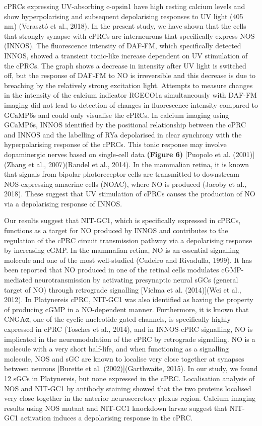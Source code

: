 \documentclass[
  10pt,
  onecolumn]{article}
\begin{document}
cPRCs expressing UV-absorbing c-opsin1 have high resting calcium levels
and show hyperpolarising and subsequent depolarising responses to UV
light (405 nm) (Verasztó et al., 2018). In the present study, we have
shown that the cells that strongly synapse with cPRCs are interneurons
that specifically express NOS (INNOS). The fluorescence intensity of
DAF-FM, which specifically detected INNOS, showed a transient tonic-like
increase dependent on UV stimulation of the cPRCs. The graph shows a
decrease in intensity after UV light is switched off, but the response
of DAF-FM to NO is irreversible and this decrease is due to breaching by
the relatively strong excitation light. Attempts to measure changes in
the intensity of the calcium indicator RGECO1a simultaneously with
DAF-FM imaging did not lead to detection of changes in fluorescence
intensity compared to GCaMP6s and could only visualise the cPRCs. In
calcium imaging using GCaMP6s, INNOS identified by the positional
relationship between the cPRC and INNOS and the labelling of RYa
depolarised in clear synchrony with the hyperpolarising response of the
cPRCs. This tonic response may involve dopaminergic nerves based on
single-cell data \textbf{(Figure 6)} {[}Puopolo et al. (2001){]}(Zhang
et al., 2007)(Randel et al., 2014). In the mammalian retina, it is known
that signals from bipolar photoreceptor cells are transmitted to
downstream NOS-expressing amacrine cells (NOAC), where NO is produced
(Jacoby et al., 2018). These suggest that UV stimulation of cPRCs causes
the production of NO via a depolarising response of INNOS.

Our results suggest that NIT-GC1, which is specifically expressed in
cPRCs, functions as a target for NO produced by INNOS and contributes to
the regulation of the cPRC circuit transmission pathway via a
depolarising response by increasing cGMP. In the mammalian retina, NO is
an essential signalling molecule and one of the most well-studied
(Cudeiro and Rivadulla, 1999). It has been reported that NO produced in
one of the retinal cells modulates cGMP-mediated neurotransmission by
activating presynaptic neural sGCs (general target of NO) through
retrograde signalling {[}Vielma et al. (2014){]}(Wei et al., 2012). In
Platynereis cPRC, NIT-GC1 was also identified as having the property of
producing cGMP in a NO-dependent manner. Furthermore, it is known that
CNGAα, one of the cyclic nucleotide-gated channels, is specifically
highly expressed in cPRC (Tosches et al., 2014), and in INNOS-cPRC
signalling, NO is implicated in the neuromodulation of the cPRC by
retrograde signalling. NO is a molecule with a very short half-life, and
when functioning as a signalling molecule, NOS and sGC are known to
localise very close together at synapses between neurons {[}Burette et
al. (2002){]}(Garthwaite, 2015). In our study, we found 12 sGCs in
Platynereis, but none expressed in the cPRC. Localisation analysis of
NOS and NIT-GC1 by antibody staining showed that the two proteins
localised very close together in the anterior neurosecretory plexus
region. Calcium imaging results using NOS mutant and NIT-GC1 knockdown
larvae suggest that NIT-GC1 activation induces a depolarising response
in the cPRC.
\end{document}
